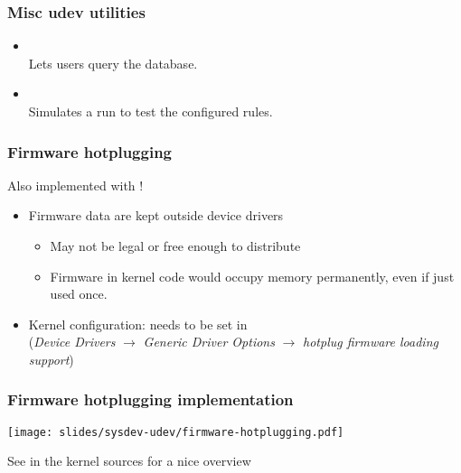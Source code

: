 \begin{frame}
  \frametitle{Misc udev utilities}
  \begin{itemize}
  \item {}\\
    Lets users query the  database.
  \item {} \\
    Simulates a  run to test the configured rules.
  \end{itemize}
\end{frame}

\begin{frame}
  \frametitle{Firmware hotplugging}
  Also implemented with !
  \begin{itemize}
  \item Firmware data are kept outside device drivers
    \begin{itemize}
    \item May not be legal or free enough to distribute
    \item Firmware in kernel code would occupy memory permanently,
      even if just used once.
    \end{itemize}
  \item Kernel configuration: needs to be set in \\
    ({\em Device Drivers} $\rightarrow$ {\em Generic Driver Options}
    $\rightarrow$ {\em hotplug firmware loading support})
  \end{itemize}
\end{frame}

\begin{frame}
  \frametitle{Firmware hotplugging implementation}
  \begin{center}
    \texttt{[image: slides/sysdev-udev/firmware-hotplugging.pdf]}
  \end{center}
  See  in the kernel sources for a
  nice overview
\end{frame}

